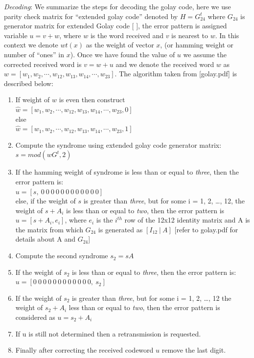\emph{Decoding}: We summarize the steps for decoding the golay code, here we use parity check matrix for ``extended golay code'' denoted by $H = G^t_{24}$ where $G_{24}$ is generator matrix for extended Golay code [ ], the error pattern is assigned variable $u = v + w$, where $w$ is the word received and $v$ is nearest to $w$. In this context we denote $wt(x)$ as the weight of vector $x$, (or hamming weight or number of ``ones'' in $x$). Once we have found the value of $u$ we assume the
corrected received word is $v = w + u$ and we denote the received word $w$ as $w = [w_1, w_2, \cdots , w_{12}, w_{13}, w_{14}, \cdots , w_{23}]$. The algorithm taken from [golay.pdf] is described below:
\begin{enumerate}
	\item If weight of $w$ is even then construct\\
		\tab $\hat{w} = [ w_1, w_2, \cdots , w_{12}, w_{13}, w_{14}, \cdots , w_{23}, 0]$\\
		  else\\
		\tab $\hat{w} = [ w_1, w_2, \cdots , w_{12}, w_{13}, w_{14}, \cdots , w_{23}, 1]$\\
	\item Compute the syndrome using extended golay code generator matrix:\\
		\tab \tab \tab \tab $s = mod(wG^t, 2)$
	\item If the hamming weight of syndrome is less than or equal to \emph{three}, then the error pattern is:\\
		\tab \tab \tab $u = [s,\  0\  0\  0\  0\  0\  0\  0\  0\  0\  0\  0\  0]$\\
		else, if the weight of $s$ is greater than \emph{three}, but for some i = 1, 2, \ldots, 12, the weight of $s + A_i$ is less than or equal to \emph{two}, then the error pattern is $u = [ s + A_i, e_i]$, where $e_i$ is the $i^{th}$ row of the 12x12 identity matrix and A is the matrix from which $G_{24}$ is generated as $[I_{12}\:|\:A]$ [refer to golay.pdf for details about A and $G_{24}$]
	\item Compute the second  syndrome $s_2 = s A$
	\item If the weight of $s_2$ is less than or equal to \emph{three}, then the error pattern is:\\
		\tab \tab \tab $u = [ 0\  0\  0\  0\  0\  0\  0\  0\  0\  0\  0\  0,\ s_2]$
	\item If the weight of $s_2$ is greater than \emph{three}, but for some i = 1, 2, \ldots, 12 the weight of $s_2 + A_i$ less than or equal to \emph{two}, then the error pattern is considered as $u = s_2 + A_i$
	\item If u is still not determined then a retransmission is requested.

	\item Finally after correcting the received codeword $u$ remove the last digit.
\end{enumerate}


